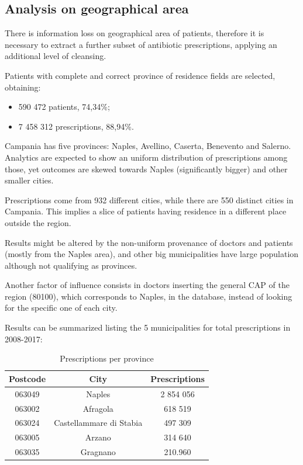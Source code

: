 \subsection{Analysis on geographical area}
There is information loss on geographical area of patients, therefore it is necessary to extract a further subset of antibiotic prescriptions, applying an additional level of cleansing.

Patients with complete and correct province of residence fields are selected, obtaining:
\begin{itemize}
	\item 590 472 patients, 74,34\%;
	\item 7 458 312 prescriptions, 88,94\%.
\end{itemize}

Campania has five provinces: Naples, Avellino, Caserta, Benevento and Salerno. Analytics are expected to show an uniform distribution of prescriptions among those, yet outcomes are skewed towards Naples (significantly bigger) and other smaller cities.

Prescriptions come from 932 different cities, while there are 550 distinct cities in Campania. This implies a slice of patients having residence in a different place outside the region.

Results might be altered by the non-uniform provenance of doctors and patients (mostly from the Naples area), and other big municipalities have large population although not qualifying as provinces. 

Another factor of influence consists in doctors inserting the general CAP of the region (80100), which corresponds to Naples, in the database, instead of looking for the specific one of each city.

Results can be summarized listing the 5 municipalities for total prescriptions in 2008-2017:
\begin{table}[h]
	\centering
	\begin{tabular}{c|c|c}
		\textbf{Postcode} & \textbf{City} & \textbf{Prescriptions} \\
		\hline
		063049 & Naples & 2 854 056 \\
		\hline
		063002 & Afragola & 618 519 \\
		\hline
		063024 & Castellammare di Stabia & 497 309 \\
		\hline
		063005 & Arzano & 314 640 \\
		\hline
		063035 & Gragnano & 210.960 \\
	\end{tabular}
\caption{\small Prescriptions per province}
\end{table}

